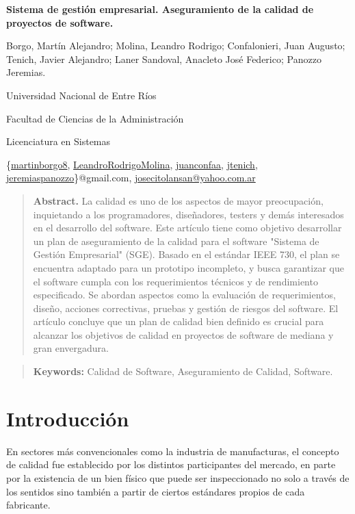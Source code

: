\documentclass[a4paper,10pt]{article}
\begin{document}
	\centering
	{\fontsize{14}{17}\bfseries Sistema de gestión empresarial. Aseguramiento de la calidad de proyectos de software.\par}
	{\small Borgo, Martín Alejandro; Molina, Leandro Rodrigo; Confalonieri, Juan Augusto; Tenich, Javier Alejandro; Laner Sandoval, Anacleto José Federico; Panozzo Jeremias.\par}
	{\normalsize Universidad Nacional de Entre Ríos\par}
	{\normalsize Facultad de Ciencias de la Administración\par}
	{\normalsize Licenciatura en Sistemas\par}
	{\small
		\{\href{mailto:martinborgo8@gmail.com}{martinborgo8},
		\href{mailto:LeandroRodrigoMolina@gmail.com}{LeandroRodrigoMolina},
		\href{mailto:juanconfaa@gmail.com}{juanconfaa},
		\href{mailto:jtenich@gmail.com}{jtenich},
		\href{mailto:jeremiaspanozzo@gmail.com}{jeremiaspanozzo}\}@gmail.com,
		\href{mailto:josecitolansan@yahoo.com.ar}{josecitolansan@yahoo.com.ar}
		\par}	
	{\begin{quote} \small \justify\textbf{Abstract.} La calidad es uno de los aspectos de mayor preocupación, inquietando a los programadores, diseñadores, testers y demás interesados en el desarrollo del software. Este artículo tiene como objetivo desarrollar un plan de aseguramiento de la calidad para el software "Sistema de Gestión Empresarial" (SGE). Basado en el estándar IEEE 730, el plan se encuentra adaptado para un prototipo incompleto, y busca garantizar que el software cumpla con los requerimientos técnicos y de rendimiento especificado. Se abordan aspectos como la evaluación de requerimientos, diseño, acciones correctivas, pruebas y gestión de riesgos del software. El artículo concluye que un plan de calidad bien definido es crucial para alcanzar los objetivos de calidad en proyectos de software de mediana y gran envergadura. \end{quote} \par}
	{\begin{quote} \small \justify\textbf{Keywords:} Calidad de Software, Aseguramiento de Calidad, Software.\end{quote} \par}
	
	\justifying
	
	\section{Introducción}
	En sectores más convencionales como la industria de manufacturas, el concepto de calidad fue establecido por los distintos participantes del mercado, en parte por la existencia de un bien físico que puede ser inspeccionado no solo a través de los sentidos sino también a partir de ciertos estándares propios de cada fabricante.
	
\end{document}
